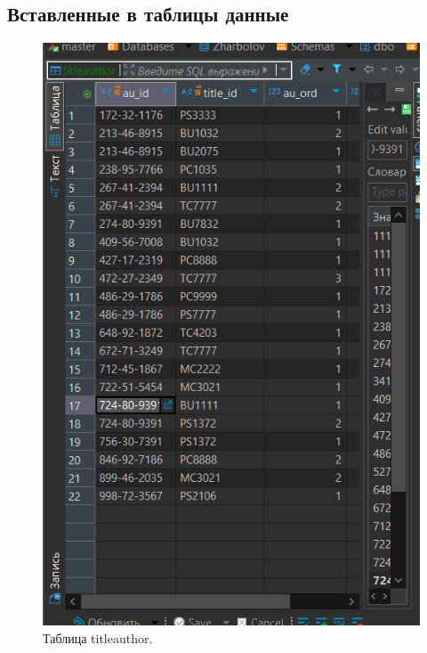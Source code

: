 \subsection{Вставленные в таблицы данные}
\label{DATA3}
\begin{figure}[h!]
    \begin{minipage}[p]{0.45\linewidth}
        \centering
        \includegraphics[width=0.8\linewidth]{Pic/lab3/DataTA.PNG}
        \caption{Таблица titleauthor.}
    \end{minipage}
    \hfill
    \begin{minipage}[p]{0.45\linewidth}
        \centering

\end{minipage}
\end{figure}
